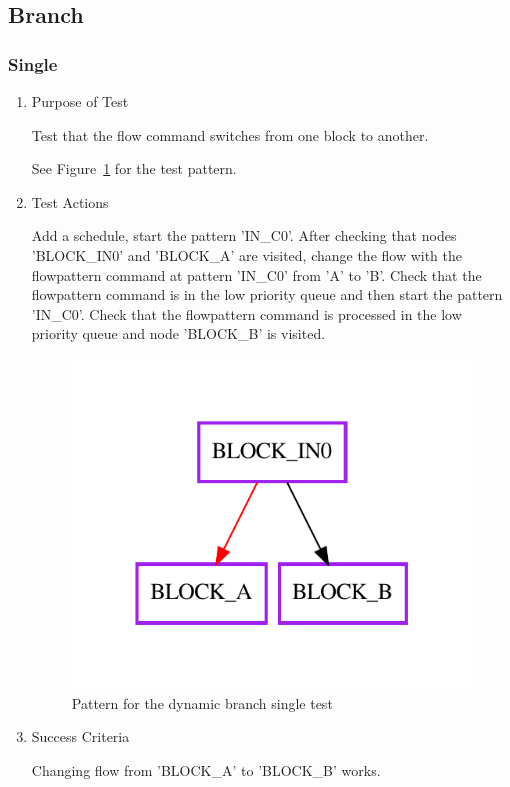 \documentclass[12pt,a4paper]{report}
\begin{document}
\subsection{Branch}
\subsubsection{Single}
\begin{enumerate}
	\item Purpose of Test

	Test that the flow command switches from one block to another.

	See Figure~\ref{fig:Pattern_for_the_dynamic_branch_single_test} for the test pattern.
	\item Test Actions

	Add a schedule, start the pattern 'IN\_C0'. After checking that nodes 'BLOCK\_IN0' and 'BLOCK\_A' are visited, change the flow with the flowpattern command at pattern 'IN\_C0' from 'A' to 'B'. Check that the flowpattern command is in the low priority queue and then start the pattern 'IN\_C0'. Check that the flowpattern command is processed in the low priority queue and node 'BLOCK\_B' is visited.
    \begin{figure}
        \centering 
        \includegraphics{TestPattern/dynamic_branch_single.pdf}
        \caption{Pattern for the dynamic branch single test}
        \label{fig:Pattern_for_the_dynamic_branch_single_test}
    \end{figure}
	\item Success Criteria

	Changing flow from 'BLOCK\_A' to 'BLOCK\_B' works.
\end{enumerate}
\end{document}
